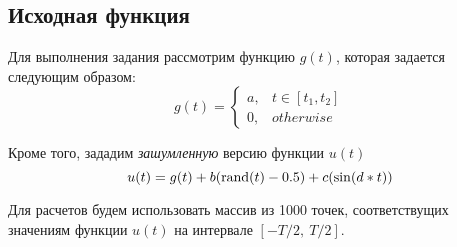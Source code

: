 \subsection{Исходная функция}

Для выполнения задания рассмотрим функцию $g(t)$, которая задается следующим образом: 
\begin{equation}
    g(t) = \begin{cases}
        a, & t \in [t_1, t_2]\\
        0, & otherwise
    \end{cases}
\end{equation}

Кроме того, зададим \textit{зашумленную} версию функции $u(t)$ 
\begin{equation}
    u(t) = g(t) + b(\operatorname{\text{rand}}(t) - 0.5) + c(\sin(d * t))  
    \label{eq:noise}
\end{equation}

Для расчетов будем использовать массив из 1000 точек, соответствущих значениям функции $u(t)$ на интервале $[-T/2,~T/2]$.




